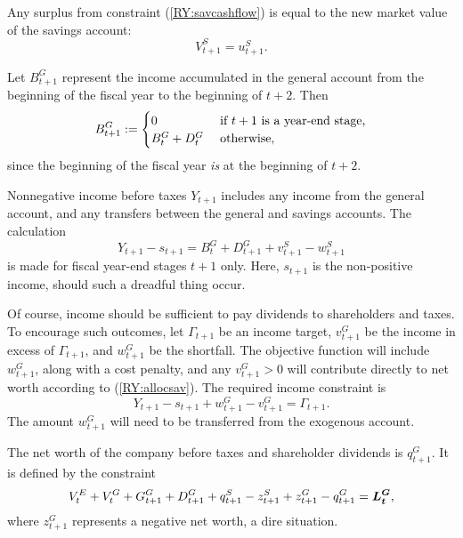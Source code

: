 Any surplus from constraint (\ref{RY:savcashflow}) is equal to the new market value of the savings account:
\begin{equation*}
V^S_{t+1} = u^S_{t+1}.
\end{equation*}

Let $B^G_{t+1}$ represent the income accumulated in the general account from the beginning of the fiscal year to the beginning of $t+2$.  Then
\begin{equation*}
B^G_{t+1}:=
\begin{cases}
	0 & \text{ if $t+1$ is a year-end stage,}\\
	B^G_t + D^G_t & \text{ otherwise,}
\end{cases}
\end{equation*}
since the beginning of the fiscal year \emph{is} at the beginning of $t+2$.

Nonnegative income before taxes $Y_{t+1}$ includes any income from the general account, and any transfers between the general and savings accounts.  The calculation
\begin{equation*}
Y_{t+1} - s_{t+1} = B^G_t + D^G_{t+1} + v^S_{t+1} - w^S_{t+1}
\end{equation*}
is made for fiscal year-end stages $t+1$ only.  Here, $s_{t+1}$ is the non-positive income, should such a dreadful thing occur.

Of course, income should be sufficient to pay dividends to shareholders and taxes.  To encourage such outcomes, let $\Gamma_{t+1}$ be an income target, $v^G_{t+1}$ be the income in excess of $\Gamma_{t+1}$, and $w^G_{t+1}$ be the shortfall.  The objective function will include $w^G_{t+1}$, along with a cost penalty, and any $v^G_{t+1} > 0$ will contribute directly to net worth according to (\ref{RY:allocsav}).  The required income constraint is
\begin{equation*}
Y_{t+1} - s_{t+1} + w^G_{t+1} - v^G_{t+1} = \Gamma_{t+1}.
\end{equation*}
The amount $w^G_{t+1}$ will need to be transferred from the exogenous account.

The net worth of the company before taxes and shareholder dividends is $q^G_{t+1}$.  It is defined by the constraint
\begin{equation*}
V^E_t + V^G_t + G^G_{t+1} + D^G_{t+1} + q^S_{t+1} - z^S_{t+1} + z^G_{t+1} - q^G_{t+1} = \mathbf{\boldsymbol{L^G_t}},
\end{equation*}
where $z^G_{t+1}$ represents a negative net worth, a dire situation.


